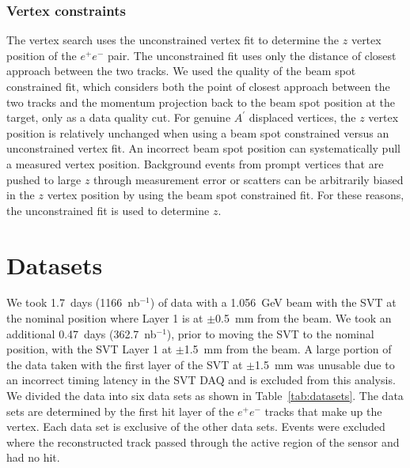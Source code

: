 \subsubsection{Vertex constraints}

The vertex search uses the unconstrained vertex fit to determine the $z$ vertex position of the $e^+e^-$ pair. The unconstrained fit uses only the distance of closest approach between the two tracks. We used the quality of the beam spot constrained fit, which considers both the point of closest approach between the two tracks and the momentum projection back to the beam spot position at the target, only as a data quality cut. For genuine $A^{\prime}$ displaced vertices, the $z$ vertex position is relatively unchanged when using a beam spot constrained versus an unconstrained vertex fit. An incorrect beam spot position can systematically pull a measured vertex position. Background events from prompt vertices that are pushed to large $z$ through measurement error or scatters can be arbitrarily biased in the $z$ vertex position by using the beam spot constrained fit. For these reasons, the unconstrained fit is used to determine $z$.\\

\section{Datasets}
We took 1.7~days (1166~nb$^{-1}$) of data with a 1.056~GeV beam with the SVT at the nominal position where Layer 1 is at $\pm$0.5~mm from the beam. We took an additional 0.47~days (362.7~nb$^{-1}$), prior to moving the SVT to the nominal position, with the SVT Layer 1 at $\pm$1.5~mm from the beam. A large portion of the data taken with the first layer of the SVT at $\pm$1.5~mm was unusable due to an incorrect timing latency in the SVT DAQ and is excluded from this analysis. We divided the data into six data sets as shown in Table~\ref{tab:datasets}. The data sets are determined by the first hit layer of the $e^+e^-$ tracks that make up the vertex. Each data set is exclusive of the other data sets. Events were excluded where the reconstructed track passed through the active region of the sensor and had no hit. 

